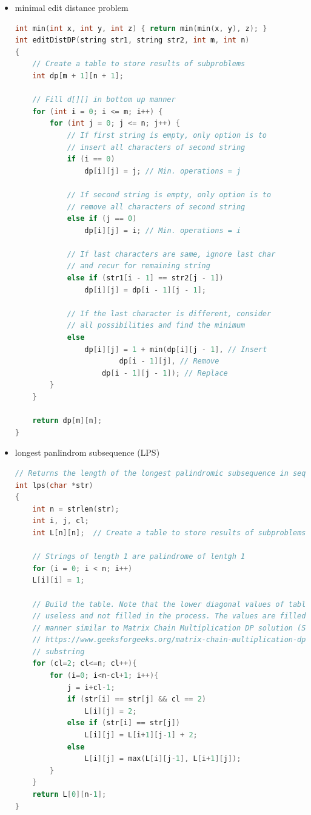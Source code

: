 \documentclass[a4paper,11pt,twoside]{book}
\begin{document}
\begin{itemize}
\begin{lstlisting}[frame=single, language=c++]
			else
			L[i][j] = max(L[i - 1][j], L[i][j - 1]); 
		} 
	} 
	
	/* L[m][n] contains length of LCS 
	for X[0..n-1] and Y[0..m-1] */
	
	return L[m][n]; 
} 	
\end{lstlisting}

\item minimal edit distance problem 
\begin{lstlisting}[frame=single, language=c++]
int min(int x, int y, int z) { return min(min(x, y), z); }
int editDistDP(string str1, string str2, int m, int n)
{
	// Create a table to store results of subproblems
	int dp[m + 1][n + 1];
	
	// Fill d[][] in bottom up manner
	for (int i = 0; i <= m; i++) {
		for (int j = 0; j <= n; j++) {
			// If first string is empty, only option is to
			// insert all characters of second string
			if (i == 0)
				dp[i][j] = j; // Min. operations = j
			
			// If second string is empty, only option is to
			// remove all characters of second string
			else if (j == 0)
				dp[i][j] = i; // Min. operations = i
			
			// If last characters are same, ignore last char
			// and recur for remaining string
			else if (str1[i - 1] == str2[j - 1])
				dp[i][j] = dp[i - 1][j - 1];
			
			// If the last character is different, consider
			// all possibilities and find the minimum
			else
				dp[i][j] = 1 + min(dp[i][j - 1], // Insert
						dp[i - 1][j], // Remove
					dp[i - 1][j - 1]); // Replace
		}
	}
	
	return dp[m][n];
}	
\end{lstlisting}

\item longest panlindrom subsequence (LPS)
\begin{lstlisting}[frame=single, language=c++]
// Returns the length of the longest palindromic subsequence in seq
int lps(char *str)
{
	int n = strlen(str);
	int i, j, cl;
	int L[n][n];  // Create a table to store results of subproblems
		
	// Strings of length 1 are palindrome of lentgh 1
	for (i = 0; i < n; i++)
	L[i][i] = 1;
	
	// Build the table. Note that the lower diagonal values of table are
	// useless and not filled in the process. The values are filled in a
	// manner similar to Matrix Chain Multiplication DP solution (See
	// https://www.geeksforgeeks.org/matrix-chain-multiplication-dp-8/). cl is length of
	// substring
	for (cl=2; cl<=n; cl++){
		for (i=0; i<n-cl+1; i++){
			j = i+cl-1;
			if (str[i] == str[j] && cl == 2)
				L[i][j] = 2;
			else if (str[i] == str[j])
				L[i][j] = L[i+1][j-1] + 2;
			else
				L[i][j] = max(L[i][j-1], L[i+1][j]);
		}
	}
	return L[0][n-1];
}


\end{lstlisting}
\end{itemize}
\end{document}
